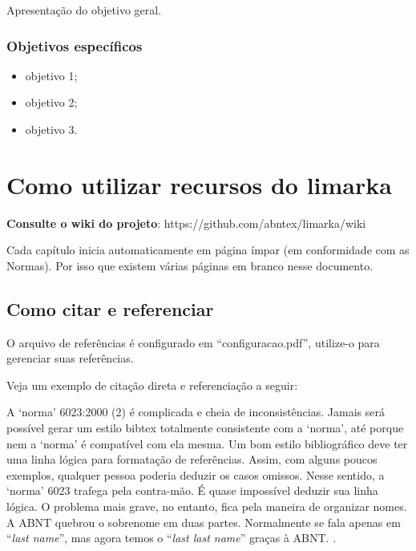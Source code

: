 \documentclass[
	12pt,				%
	oneside,			%
	a4paper,			%
	english,			%
	french,				%
	spanish,			%
	brazil				%
	]{abntex2}
\renewenvironment{quote}
  {\small\list{}{\rightmargin=0.1cm \leftmargin=4cm}%
   \item\relax}
  {\endlist}
\begin{document}
Apresentação do objetivo geral.

\hypertarget{objetivos-especuxedficos}{%
\subsection{Objetivos específicos}\label{objetivos-especuxedficos}}

\begin{itemize}
\tightlist
\item
  objetivo 1;
\item
  objetivo 2;
\item
  objetivo 3.
\end{itemize}

\hypertarget{como-utilizar-recursos-do-limarka}{%
\chapter{Como utilizar recursos do
limarka}\label{como-utilizar-recursos-do-limarka}}

\textbf{Consulte o wiki do projeto}:
https://github.com/abntex/limarka/wiki

Cada capítulo inicia automaticamente em página ímpar (em conformidade
com as Normas). Por isso que existem várias páginas em branco nesse
documento.

\hypertarget{como-citar-e-referenciar}{%
\section{Como citar e referenciar}\label{como-citar-e-referenciar}}

O arquivo de referências é configurado em ``configuracao.pdf'',
utilize-o para gerenciar suas referências.

Veja um exemplo de citação direta e referenciação a seguir:

\begin{quote}
A `norma' 6023:2000 (2) é complicada e cheia de inconsistências. Jamais
será possível gerar um estilo bibtex totalmente consistente com a
`norma', até porque nem a `norma' é compatível com ela mesma. Um bom
estilo bibliográfico deve ter uma linha lógica para formatação de
referências. Assim, com alguns poucos exemplos, qualquer pessoa poderia
deduzir os casos omissos. Nesse sentido, a `norma' 6023 trafega pela
contra-mão. É quase impossível deduzir sua linha lógica. O problema mais
grave, no entanto, fica pela maneira de organizar nomes. A ABNT quebrou
o sobrenome em duas partes. Normalmente se fala apenas em ``\emph{last
name}'', mas agora temos o ``\emph{last last name}'' graças à ABNT.
\cite[p. 5]{abntex2cite}.
\end{quote}
\end{document}
